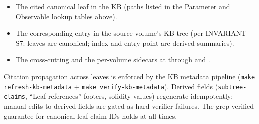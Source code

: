 \begin{itemize}
    \item The cited canonical leaf in the KB (paths listed in the Parameter and Observable lookup tables above).
    \item The corresponding  entry in the source volume's KB tree (per INVARIANT-S7: leaves are canonical; index and entry-point are derived summaries).
    \item The cross-cutting  and the per-volume sidecars at  through  and .
\end{itemize}

Citation propagation across leaves is enforced by the KB metadata pipeline (\texttt{make refresh-kb-metadata} + \texttt{make verify-kb-metadata}). Derived fields (\texttt{subtree-claims}, ``Leaf references'' footers, solidity values) regenerate idempotently; manual edits to derived fields are gated as hard verifier failures. The grep-verified guarantee for canonical-leaf-claim IDs holds at all times.
%

